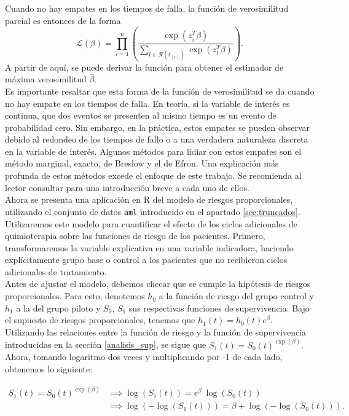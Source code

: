 \documentclass[11pt,a4paper]{article}
\begin{document}
Cuando no hay empates en los tiempos de falla, la función de verosimilitud parcial es entonces de la forma
$$\mathcal{L}(\beta) = \prod_{i=1}^n \left(\frac{\exp (z_i^T \beta)}{\sum_{l\in \mathcal{R}(t_{(i)})}\exp (z_l^T \beta)}\right).$$ A partir de aquí, se puede derivar la función para obtener el estimador de máxima verosimilitud $\hat{\beta}$.\\

Es importante resaltar que esta forma de la función de verosimilitud se da cuando no hay empate en los tiempos de falla. En teoría, si la variable de interés es continua, que dos eventos se presenten al mismo tiempo es un evento de probabilidad cero. Sin embargo, en la práctica, estos empates se pueden observar debido al redondeo de los tiempos de fallo o a una verdadera naturaleza discreta en la variable de interés. Algunos métodos para lidiar con estos empates son el método marginal, exacto, de Breslow y el de Efron. Una explicación más profunda de estos métodos excede el enfoque de este trabajo. Se recomienda al lector consultar \citet{moore} para una introducción breve a cada uno de ellos.\\

Ahora se presenta una aplicación en R del modelo de riesgos proporcionales, utilizando el conjunto de datos \texttt{aml} introducido en el apartado \ref{sec:truncados}. Utilizaremos este modelo para cuantificar el efecto de los ciclos adicionales de quimioterapia sobre las funciones de riesgo de los pacientes. Primero, transformaremos la variable explicativa en una variable indicadora, haciendo explícitamente grupo base o control a los pacientes que no recibieron ciclos adicionales de tratamiento.\\

Antes de ajustar el modelo, debemos checar que se cumple la hipótesis de riesgos proporcionales. Para esto, denotemos $h_0$ a la función de riesgo del grupo control y $h_1$ a la del grupo piloto y $S_0$, $S_1$ sus respectivas funciones de supervivencia. Bajo el supuesto de riesgos proporcionales, tenemos que $h_1(t) = h_0(t) e^\beta.$ Utilizando las relaciones entre la función de riesgo y la función de supervivencia introducidas en la sección \ref{analisis_sup}, se sigue que $S_1(t) = S_0(t) ^ {\exp (\beta)}.$ Ahora, tomando logaritmo dos veces y multiplicando por -1 de cada lado, obtenemos lo siguiente:

\begin{align*}
S_1(t) = S_0(t) ^ {\exp (\beta)} &\implies \log (S_1(t)) = e^\beta \ \log (S_0(t))\\
&\implies \log (-\log (S_1(t))) = \beta + \log (-\log (S_0(t))).\\
\end{align*}
\end{document}
